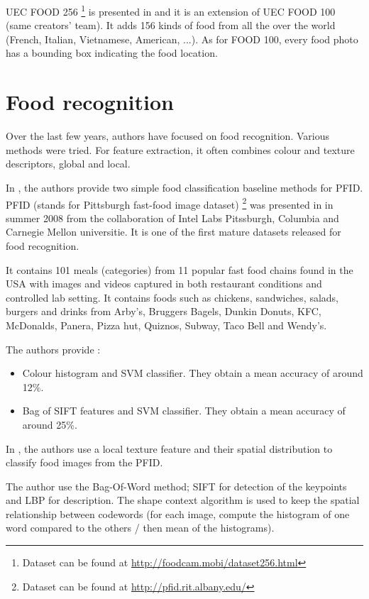 UEC FOOD 256 \footnote{Dataset can be found at \url{http://foodcam.mobi/dataset256.html}} is presented in \cite{Kawano2015} and it is an extension of UEC FOOD 100 (same creators' team). It adds 156 kinds of food from all the over the world (French, Italian, Vietnamese, American, ...). As for FOOD 100, every food photo has a bounding box indicating the food location.

\section{Food recognition}

%
%

Over the last few years, authors have focused on food recognition. Various methods were tried. For feature extraction, it often combines colour and texture descriptors, global and local.

In \cite{Chen2009}, the authors provide two simple food classification baseline methods for PFID. PFID (stands for Pittsburgh fast-food image dataset) \footnote{Dataset can be found at \url{http://pfid.rit.albany.edu/}} was presented in \cite{Chen2009} in summer 2008 from the collaboration of Intel Labs Pitssburgh, Columbia and Carnegie Mellon universitie. It is one of the first mature datasets released for food recognition.

It contains 101 meals (categories) from 11 popular fast food chains found in the USA with images and videos captured in both restaurant conditions and controlled lab setting. It contains foods such as chickens, sandwiches, salads, burgers and drinks from Arby's, Bruggers Bagels, Dunkin Donuts, KFC, McDonalds, Panera, Pizza hut, Quiznos, Subway, Taco Bell and Wendy's.

The authors provide :
\begin{itemize}
    \item Colour histogram and SVM classifier. They obtain a mean accuracy of around 12\%.
    \item Bag of SIFT features and SVM classifier. They obtain a mean accuracy of around 25\%.
\end{itemize}

In \cite{Zong2010}, the authors use a local texture feature and their spatial distribution to classify food images from the PFID.

The author use the Bag-Of-Word method; SIFT for detection of the keypoints and LBP for description. The shape context algorithm is used to keep the spatial relationship between codewords (for each image, compute the histogram of one word compared to the others / then mean of the histograms).

